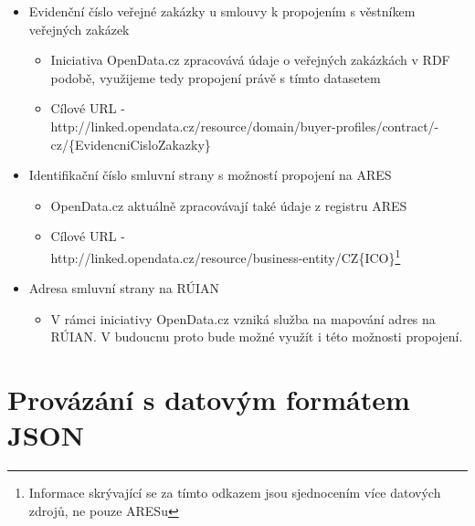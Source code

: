 \begin{itemize}
\item Evidenční číslo veřejné zakázky u smlouvy k propojením s věstníkem veřejných zakázek
	\begin{itemize}
	\item Iniciativa OpenData.cz\cite{od} zpracovává údaje o veřejných zakázkách v RDF podobě, využijeme tedy propojení právě s tímto datasetem 
	\item Cílové URL -\\http://linked.opendata.cz/resource/domain/buyer-profiles/contract/-\\cz/\{EvidencniCisloZakazky\}
	\end{itemize}
\item Identifikační číslo smluvní strany s možností propojení na ARES
	\begin{itemize}
	\item OpenData.cz aktuálně zpracovávají také údaje z registru ARES
	\item Cílové URL - \\http://linked.opendata.cz/resource/business-entity/CZ\{ICO\}\footnote{Informace skrývající se za tímto odkazem jsou sjednocením více datových zdrojů, ne pouze ARESu} 
	\end{itemize}
\item Adresa smluvní strany na RÚIAN
	\begin{itemize}
	\item V rámci iniciativy OpenData.cz vzniká služba na mapování adres na RÚIAN. V budoucnu proto bude možné využít i této možnosti propojení.
	\end{itemize}
\end{itemize}

\section{Provázání s datovým formátem JSON}

